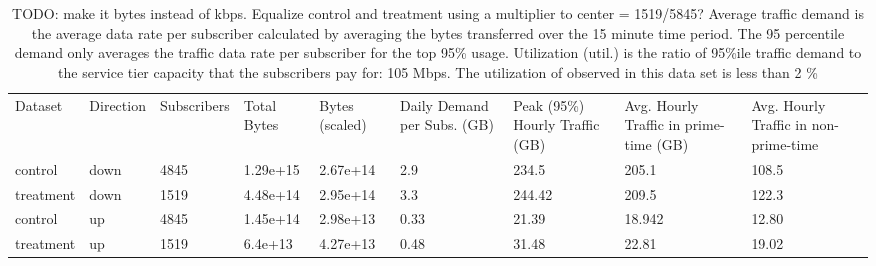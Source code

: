 \begin{table}[h]
\begin{tabular}{lllllllll}
Dataset   & Direction & Subscribers & Total Bytes       & Bytes (scaled) & Daily 
Demand per Subs. (GB) & Peak (95\%) Hourly Traffic (GB) & Avg. Hourly Traffic in 
prime-time (GB) & Avg. Hourly Traffic in non-prime-time \\
control   & down      & 4845        & 1.29e+15          & 2.67e+14       & 2.9   
                      & 234.5                           & 205.1                  
                & 108.5                                 \\
treatment & down      & 1519        & 4.48e+14          & 2.95e+14       & 3.3   
                      & 244.42                          & 209.5                  
                & 122.3                                 \\
control   & up        & 4845        & 1.45e+14          & 2.98e+13       & 0.33  
                      & 21.39                           & 18.942                 
                & 12.80                                 \\
treatment & up        & 1519        & 6.4e+13 		& 4.27e+13       & 0.48 
 
                      & 31.48                           & 22.81                  
                & 19.02                                
\end{tabular}
\caption{TODO: make it bytes instead of kbps. Equalize control and treatment 
using a multiplier to center = 1519/5845?
 Average traffic demand is the average data rate per subscriber 
 calculated by averaging the bytes transferred over the 15 minute time period. 
 The 95 percentile demand only averages the traffic data rate per subscriber 
for the top 95\% usage. Utilization (util.) is the ratio of 95\%ile traffic 
demand to the service tier capacity that the subscribers pay for: 105 Mbps. The 
utilization of observed in this data set is less than 2 \%}
\label{tab:data-stats}
\end{table}

